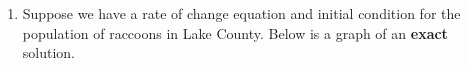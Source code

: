 \begin{enumerate}
\begin{enumerate}
\end{enumerate}

\clearpage

\item	Suppose we have a rate of change equation and initial condition for the population of raccoons in Lake County. Below is a graph of an \textbf{exact} solution. \label{02HWproblem3}


\end{enumerate}
